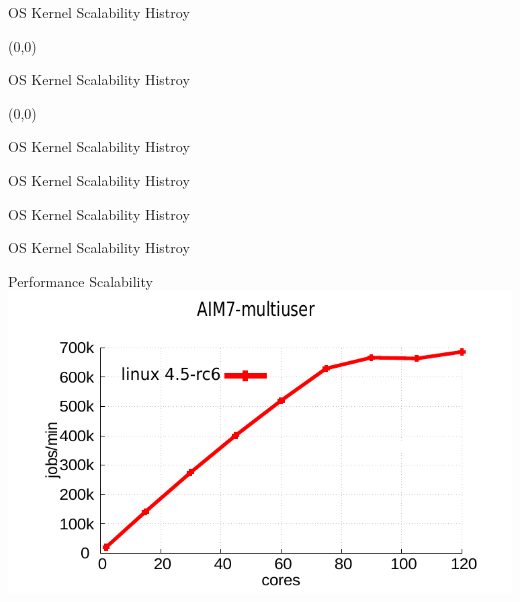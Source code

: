 \documentclass[english]{beamer} %
\begin{document}
\begin{frame}{OS Kernel Scalability Histroy}
\begin{textblock}{1}(0,0)
\end{textblock}
\end{frame}



\begin{frame}{OS Kernel Scalability Histroy}
\begin{textblock}{1}(0,0)
\end{textblock}
\end{frame}


\begin{frame}{OS Kernel Scalability Histroy}
\end{frame}


\begin{frame}{OS Kernel Scalability Histroy}
\end{frame}


\begin{frame}{OS Kernel Scalability Histroy}
\end{frame}


\begin{frame}{OS Kernel Scalability Histroy}
\end{frame}

\begin{frame}{Performance Scalability}
\includegraphics[scale=0.8]{graph/aim7_default}
\end{frame}
\end{document}
